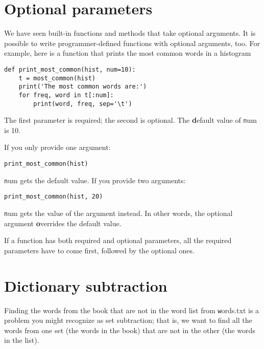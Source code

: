\documentclass[
DIV=11,
fontsize=13,
twoside,
headinclude=false,
titlepage=firstiscover,
abstract=true,
headsepline=true,
footsepline=true,
chapterprefix=true, %
headings=big,
bibliography=totoc,%
captions=tableheading
]{scrbook}
\theoremstyle{definition}
\begin{document}
\section{Optional parameters}

We have seen built-in functions and methods that take optional
arguments.  It is possible to write programmer-defined functions
with optional arguments, too.  For example, here is a function that
prints the most common words in a histogram

\begin{lstlisting}
def print_most_common(hist, num=10):
    t = most_common(hist)
    print('The most common words are:')
    for freq, word in t[:num]:
        print(word, freq, sep='\t')
\end{lstlisting}

The first parameter is required; the second is optional.
The {\textbf default value} of {\texttt num} is 10.

If you only provide one argument:

\begin{lstlisting}
print_most_common(hist)
\end{lstlisting}

{\texttt num} gets the default value.  If you provide two arguments:

\begin{lstlisting}
print_most_common(hist, 20)
\end{lstlisting}

{\texttt num} gets the value of the argument instead.  In other
words, the optional argument {\textbf overrides} the default value.

If a function has both required and optional parameters, all
the required parameters have to come first, followed by the
optional ones.


\section{Dictionary subtraction}
\label{dictsub}

Finding the words from the book that are not in the word list
from {\texttt words.txt} is a problem you might recognize as set
subtraction; that is, we want to find all the words from one
set (the words in the book) that are not in the other (the
words in the list).
\end{document}
